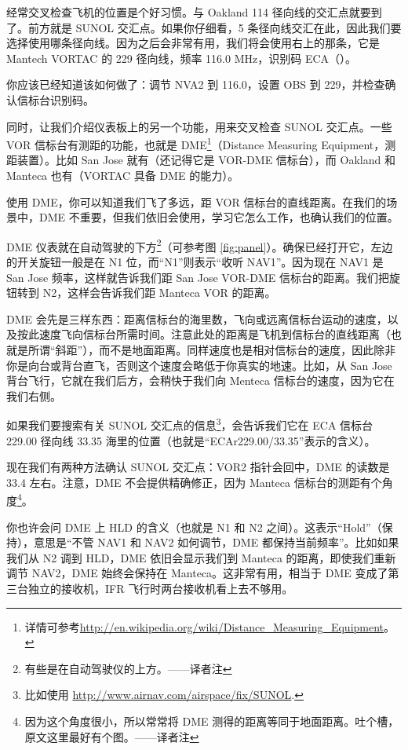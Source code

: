 经常交叉检查飞机的位置是个好习惯。与 Oakland 114 径向线的交汇点就要到了。前方就是 SUNOL 交汇点。如果你仔细看，5 条径向线交汇在此，因此我们要选择使用哪条径向线。因为之后会非常有用，我们将会使用右上的那条，它是 Mantech VORTAC 的 229 径向线，频率 116.0 MHz，识别码 ECA（\mdot\mspace \mdash\mdot\mdash\mdot\mspace \mdot\mdash）。

你应该已经知道该如何做了：调节 NVA2 到 116.0，设置 OBS 到 229，并检查确认信标台识别码。

同时，让我们介绍仪表板上的另一个功能，用来交叉检查 SUNOL 交汇点。一些 VOR 信标台有测距的功能，也就是 DME\footnote{详情可参考\url{http://en.wikipedia.org/wiki/Distance_Measuring_Equipment}。}（Distance Measuring Equipment，测距装置）。比如 San Jose 就有（还记得它是 VOR-DME 信标台），而 Oakland 和 Manteca 也有（VORTAC 具备 DME 的能力）。

使用 DME，你可以知道我们飞了多远，距 VOR 信标台的直线距离。在我们的场景中，DME 不重要，但我们依旧会使用，学习它怎么工作，也确认我们的位置。

DME 仪表就在自动驾驶的下方\footnote{有些是在自动驾驶仪的上方。——译者注}（可参考图 \ref{fig:panel}）。确保已经打开它，左边的开关旋钮一般是在 N1 位，而“N1”则表示“收听 NAV1”。因为现在 NAV1 是 San Jose 频率，这样就告诉我们距 San Jose VOR-DME 信标台的距离。我们把旋钮转到 N2，这样会告诉我们距 Manteca VOR 的距离。

DME 会先是三样东西：距离信标台的海里数，飞向或远离信标台运动的速度，以及按此速度飞向信标台所需时间。注意此处的距离是飞机到信标台的直线距离（也就是所谓“斜距”），而不是地面距离。同样速度也是相对信标台的速度，因此除非你是向台或背台直飞，否则这个速度会略低于你真实的地速。比如，从 San Jose 背台飞行，它就在我们后方，会稍快于我们向 Menteca 信标台的速度，因为它在我们右侧。

如果我们要搜索有关 SUNOL 交汇点的信息\footnote{比如使用 \url{http://www.airnav.com/airspace/fix/SUNOL}.}，会告诉我们它在 ECA 信标台 229.00 径向线 33.35 海里的位置（也就是``ECAr229.00/33.35''表示的含义）。

现在我们有两种方法确认 SUNOL 交汇点：VOR2 指针会回中，DME 的读数是 33.4 左右。注意，DME 不会提供精确修正，因为 Manteca 信标台的测距有个角度\footnote{因为这个角度很小，所以常常将 DME 测得的距离等同于地面距离。吐个槽，原文这里最好有个图。——译者注}。

你也许会问 DME 上 HLD 的含义（也就是 N1 和 N2 之间）。这表示“Hold”（保持），意思是“不管 NAV1 和 NAV2 如何调节，DME 都保持当前频率”。比如如果我们从 N2 调到 HLD，DME 依旧会显示我们到 Manteca 的距离，即使我们重新调节 NAV2，DME 始终会保持在 Manteca。这非常有用，相当于 DME 变成了第三台独立的接收机，IFR 飞行时两台接收机看上去不够用。


